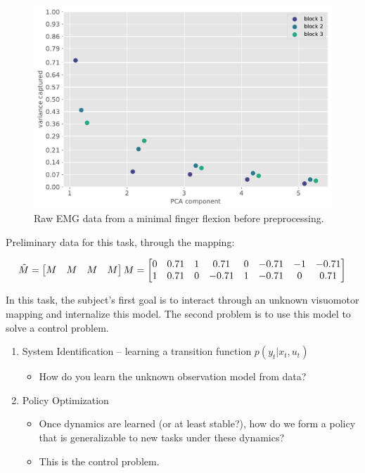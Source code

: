 \documentclass[
  a4paper,
]{article}
\makeatletter
\providecommand{\tightlist}{%
  \setlength{\itemsep}{0pt}\setlength{\parskip}{0pt}}
\newcounter{figno}
\newenvironment{fignos:no-prefix-figure-caption}{
  \caption@ifcompatibility{}{
    \let\oldthefigure\thefigure
    \let\oldtheHfigure\theHfigure
    \renewcommand{\thefigure}{figno:\thefigno}
    \renewcommand{\theHfigure}{figno:\thefigno}
    \stepcounter{figno}
    \captionsetup{labelformat=empty}
  }
}{
  \caption@ifcompatibility{}{
    \captionsetup{labelformat=default}
    \let\thefigure\oldthefigure
    \let\theHfigure\oldtheHfigure
    \addtocounter{figure}{-1}
  }
}
\makeatother
\begin{document}
\begin{fignos:no-prefix-figure-caption}

\begin{figure}
\centering
\includegraphics{images/data_analysis/center_hold/PCA_concat_variance.pdf}
\caption{Raw EMG data from a minimal finger flexion before
preprocessing.}
\end{figure}

\end{fignos:no-prefix-figure-caption}

Preliminary data for this task, through the mapping:

\[
\tilde{M} = \begin{bmatrix}M & M & M & M\end{bmatrix} \\
M =
\begin{bmatrix}
0  & 0.71  & 1   & 0.71   & 0  & -0.71  & -1  & -0.71 \\
1  & 0.71  & 0  & -0.71  & 1   & -0.71   & 0   & 0.71
\end{bmatrix}
\]

In this task, the subject's first goal is to interact through an unknown
visuomotor mapping and internalize this model. The second problem is to
use this model to solve a control problem.

\begin{enumerate}
\def\labelenumi{\arabic{enumi}.}
\tightlist
\item
  System Identification -- learning a transition function
  \(p(y_t|x_t, u_t)\)

  \begin{itemize}
  \tightlist
  \item
    How do you learn the unknown observation model from data?
  \end{itemize}
\item
  Policy Optimization

  \begin{itemize}
  \tightlist
  \item
    Once dynamics are learned (or at least stable?), how do we form a
    policy that is generalizable to new tasks under these dynamics?
  \item
    This is the control problem.
  \end{itemize}
\end{enumerate}
\end{document}
